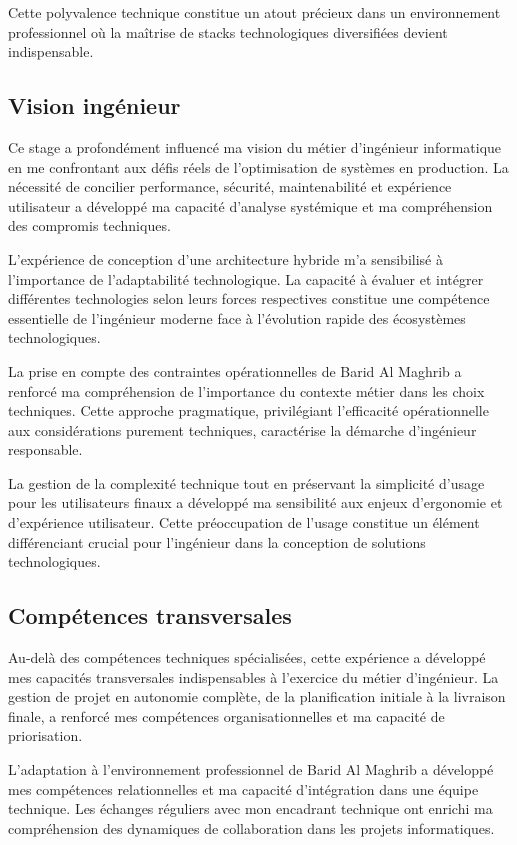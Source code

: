 Cette polyvalence technique constitue un atout précieux dans un environnement professionnel où la maîtrise de stacks technologiques diversifiées devient indispensable.
\subsection{Vision ingénieur}

Ce stage a profondément influencé ma vision du métier d'ingénieur informatique en me confrontant aux défis réels de l'optimisation de systèmes en production. La nécessité de concilier performance, sécurité, maintenabilité et expérience utilisateur a développé ma capacité d'analyse systémique et ma compréhension des compromis techniques.

L'expérience de conception d'une architecture hybride m'a sensibilisé à l'importance de l'adaptabilité technologique. La capacité à évaluer et intégrer différentes technologies selon leurs forces respectives constitue une compétence essentielle de l'ingénieur moderne face à l'évolution rapide des écosystèmes technologiques.

La prise en compte des contraintes opérationnelles de Barid Al Maghrib a renforcé ma compréhension de l'importance du contexte métier dans les choix techniques. Cette approche pragmatique, privilégiant l'efficacité opérationnelle aux considérations purement techniques, caractérise la démarche d'ingénieur responsable.

La gestion de la complexité technique tout en préservant la simplicité d'usage pour les utilisateurs finaux a développé ma sensibilité aux enjeux d'ergonomie et d'expérience utilisateur. Cette préoccupation de l'usage constitue un élément différenciant crucial pour l'ingénieur dans la conception de solutions technologiques.

\subsection{Compétences transversales}

Au-delà des compétences techniques spécialisées, cette expérience a développé mes capacités transversales indispensables à l'exercice du métier d'ingénieur. La gestion de projet en autonomie complète, de la planification initiale à la livraison finale, a renforcé mes compétences organisationnelles et ma capacité de priorisation.

L'adaptation à l'environnement professionnel de Barid Al Maghrib a développé mes compétences relationnelles et ma capacité d'intégration dans une équipe technique. Les échanges réguliers avec mon encadrant technique ont enrichi ma compréhension des dynamiques de collaboration dans les projets informatiques.

